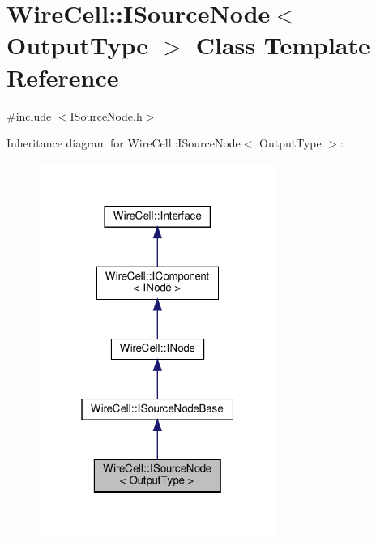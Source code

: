 \hypertarget{class_wire_cell_1_1_i_source_node}{}\section{Wire\+Cell\+:\+:I\+Source\+Node$<$ Output\+Type $>$ Class Template Reference}
\label{class_wire_cell_1_1_i_source_node}


{\ttfamily \#include $<$I\+Source\+Node.\+h$>$}



Inheritance diagram for Wire\+Cell\+:\+:I\+Source\+Node$<$ Output\+Type $>$\+:
\nopagebreak
\begin{figure}[H]
\begin{center}
\leavevmode
\includegraphics[width=220pt]{class_wire_cell_1_1_i_source_node__inherit__graph}
\end{center}
\end{figure}


